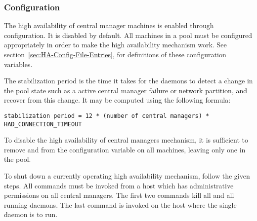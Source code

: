 

\subsubsection{\label{sec:HA-configuration} Configuration} 

The high availability of central manager machines is
enabled through configuration.
It is disabled by default.
All machines in a pool must be configured appropriately
in order to make the high availability mechanism work.
See
section~\ref{sec:HA-Config-File-Entries},
for definitions of these configuration variables.

The stabilization period is the time it takes for the 
 daemons
to detect a change in the pool state such as
a active central manager failure
or network partition, and recover from this change.
It may be computed using the following formula:
\footnotesize
\begin{verbatim}
stabilization period = 12 * (number of central managers) * HAD_CONNECTION_TIMEOUT
\end{verbatim}
\normalsize


To disable the high availability of central managers mechanism,
it is sufficient to remove
 and  from the
 configuration variable on all machines,
leaving only one  in the pool. 

To shut down a currently operating high availability mechanism,
follow the given steps.
All commands must be invoked
from a host which has administrative permissions
on all central managers.
The first two commands kill all 
and all running  daemons.
The last command is invoked on the host where the
single  daemon is to run.

